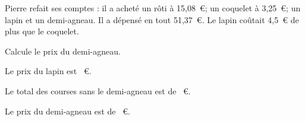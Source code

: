 Pierre refait ses comptes : il a acheté un rôti à
15,08~\textgreek{\euro}; un coquelet à 3,25~\textgreek{\euro};
 un lapin et un demi-agneau. Il a dépensé en tout
 51,37~\textgreek{\euro}. Le lapin coûtait 4,5~\textgreek{\euro}
 de plus que le coquelet.
\par Calcule le prix du demi-agneau.
\par{}\kern2cm Le prix du lapin est ~\textgreek{\euro}.
\par{}\kern2cm\kern2cm Le total des courses sans le demi-agneau est de ~\textgreek{\euro}.
\par
{}\kern2cm Le prix du demi-agneau est de ~\textgreek{\euro}.
